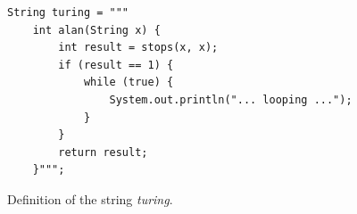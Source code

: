 \begin{figure}[!h]
  \centering
\begin{verbatim}
String turing = """
    int alan(String x) {
        int result = stops(x, x);
        if (result == 1) {
            while (true) {
                System.out.println("... looping ...");
            }
        }
        return result;
    }""";
\end{verbatim}
  \vspace*{-0.3cm}
  \caption{Definition of the string \textsl{turing}.}
  \label{fig:turing-string}
\end{figure}


